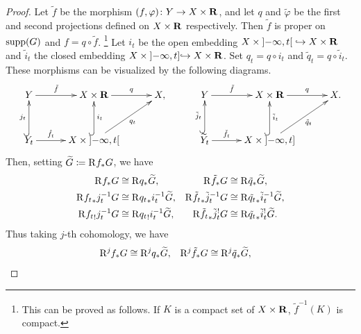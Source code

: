 \begin{proof}
  Let \(\tilde{f}\) be the morphism \(
    (f,\varphi)\colon Y\to X\times \rr
  \), and let \(q\) and \(\tilde{\varphi}\) be 
  the first and second projections 
  defined on \(X\times \rr\) respectively. 
  Then \(\tilde{f}\) is proper on \(\supp(G)\) and 
  \(f=q\circ \tilde{f}\). \footnote{This can be proved as follows. 
  If \(K\) is a compact set of \(X\times \rr\), 
  \(\tilde{f}^{-1}(K)\) is compact.}
  Let \(i_t\) be the open embedding \(
    X\times\lopen -\infty, t\ropen\hookrightarrow X\times \rr
  \) and \(\tilde{i}_t\) the closed embedding \(
    X\times\lopen -\infty, t\rclosed\hookrightarrow X\times \rr
  \). Set \(q_t=q\circ i_t\) and \(\tilde{q}_t=q\circ\tilde{i}_t\). 
  These morphisms can be visualized by the following diagrams.
  \[\vcenter{\xymatrix@C=30pt@R=30pt{
    Y
      \ar[r]^-{\tilde{f}}
    &
    X\times\rr
      \ar[r]^-{q}
    &
    X,
    &
    Y
      \ar[r]^-{\tilde{f}}
    &
    X\times\rr
      \ar[r]^-{q}
    &
    X.\\
    Y_{t}
      \ar@{^(->}[u]^-{j_t}
      \ar[r]^-{\hat{f}_{t}}
    &
    X\times \lopen-\infty,t\ropen
      \ar@{^(->}[u]_-{i_{t}}
      \ar[ur]_-{q_{t}}
    &
    &
    \widetilde{Y}_{t}
      \ar@{^(->}[u]^-{\tilde{j}_t}
      \ar[r]^-{\check{f}_{t}}
    &
    X\times \lopen-\infty,t\rclosed
      \ar@{^(->}[u]_-{\tilde{i}_{t}}
      \ar[ur]_-{\tilde{q}_{t}}
    &
  }}\]
  Then, setting \(\widetilde{G}\coloneqq \Rder[]{f_{\ast}}G\), 
  we have \begin{align*}
    \Rder[]{f_{\ast}}G
    &\cong 
    \Rder[]{q_{\ast}}\widetilde{G},
    &
    \Rder[]{\tilde{f}_{\ast}}G
    &\cong 
    \Rder[]{\tilde{q}_{\ast}}\widetilde{G},
    \\
    \Rder[]{{f_{t}}_{\ast}}j_{t}^{-1}G
    &\cong 
    \Rder[]{{q_{t}}_{\ast}}i_{t}^{-1}\widetilde{G},
    &
    \Rder[]{\tilde{f_{t}}_{\ast}}\tilde{j}_{t}^{-1}G
    &\cong 
    \Rder[]{\tilde{q_{t}}_{\ast}}\tilde{i}_{t}^{-1}\widetilde{G},
    \\
    \Rder[]{{f_{t}}_{!}}j_{t}^{-1}G
    &\cong 
    \Rder[]{{q_{t}}_{!}}i_{t}^{-1}\widetilde{G},
    &
    \Rder[]{\tilde{f_{t}}_{\ast}}\tilde{j}_{t}^{!}G
    &\cong 
    \Rder[]{\tilde{q_{t}}_{\ast}}\tilde{i}_{t}^{!}\widetilde{G}.
  \end{align*}
  Thus taking \(j\)-th cohomology, we have\begin{align*}
    \Rder[j]{f_{\ast}}G
    &\cong 
    \Rder[j]{q_{\ast}}\widetilde{G},
    &
    \Rder[j]{\tilde{f}_{\ast}}G
    &\cong 
    \Rder[j]{\tilde{q}_{\ast}}\widetilde{G},

\end{align*}
\end{proof}
